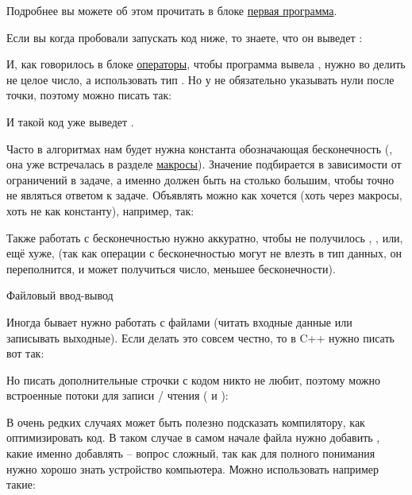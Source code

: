 
Подробнее вы можете об этом прочитать в блоке \hyperlink{1.1}{первая программа}.


\startspace
{}
\endspace

Если вы когда пробовали запускать код ниже, то знаете, что он выведет :


И, как говорилось в блоке \hyperlink{1.3}{операторы}, чтобы программа вывела , нужно во делить не целое число, а использовать тип . Но у  не обязательно указывать нули после точки, поэтому можно писать так:


И такой код уже выведет .


\startspace
{}
\endspace

Часто в алгоритмах нам будет нужна константа обозначающая бесконечность (, она уже встречалась в разделе \hyperlink{macros}{макросы}). Значение  подбирается в зависимости от ограничений в задаче, а именно  должен быть на столько большим, чтобы точно не являться ответом к задаче. Объявлять  можно как хочется (хоть через макросы, хоть не как константу), например, так:


Также работать с бесконечностью нужно аккуратно, чтобы не получилось , , или, ещё хуже,  (так как операции с бесконечностью могут не влезть в тип данных, он переполнится, и может получиться число, меньшее бесконечности).


\startspace
Файловый ввод-вывод
\endspace

Иногда бывает нужно работать с файлами (читать входные данные или записывать выходные). Если делать это совсем честно, то в C++ нужно писать вот так:


Но писать дополнительные строчки с кодом никто не любит, поэтому можно  встроенные потоки для записи / чтения ( и ):



\startspace
{}
\endspace

В очень редких случаях может быть полезно подсказать компилятору, как оптимизировать код. В таком случае в самом начале файла нужно добавить , какие именно добавлять -- вопрос сложный, так как для полного понимания нужно хорошо знать устройство компьютера. Можно использовать например такие:

